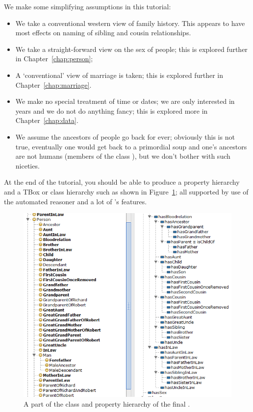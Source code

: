 We make some simplifying assumptions in this tutorial:
\begin{itemize}
\item We take a conventional western  view of family history. This appears to have most effects on naming of sibling and cousin relationships.
\item We take a straight-forward view on the sex of people; this is explored further in Chapter~\ref{chap:person};
\item A `conventional' view of marriage is taken; this is explored further in Chapter~\ref{chap:marriage}.
\item We make no special treatment of time or dates; we are only interested in years and we do not do anything fancy; this is explored more in Chapter~\ref{chap:data}.
\item We assume the ancestors of people go back for ever; obviously this is not true, eventually one would get back to a primordial soup and one's ancestors are not humans (members of the class \person), but we don't bother with such niceties. 
\end{itemize}
At the end of the tutorial, you should be able to produce a property hierarchy and a TBox or class hierarchy such as shown in Figure~\ref{fig:class_and_prop_hierachy}; all supported by use of the automated reasoner and a lot of \owlii's features.


\begin{figure}
\begin{center}
\includegraphics[width=\largefigwidth]{figures/class_prop_hierachy_final}\caption{A part of the class and property hierarchy of the final \fhkb.}\label{fig:class_and_prop_hierachy}
\end{center}
\end{figure}


